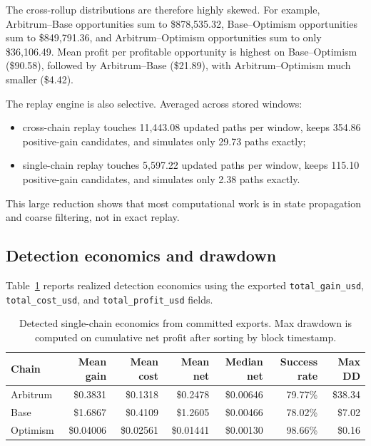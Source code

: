 \documentclass[11pt]{article}
\begin{document}
The cross-rollup distributions are therefore highly skewed. For example, Arbitrum--Base opportunities sum to \$878{,}535.32, Base--Optimism opportunities sum to \$849{,}791.36, and Arbitrum--Optimism opportunities sum to only \$36{,}106.49. Mean profit per profitable opportunity is highest on Base--Optimism (\$90.58), followed by Arbitrum--Base (\$21.89), with Arbitrum--Optimism much smaller (\$4.42).

The replay engine is also selective. Averaged across stored windows:
\begin{itemize}[leftmargin=1.5em]
    \item cross-chain replay touches 11{,}443.08 updated paths per window, keeps 354.86 positive-gain candidates, and simulates only 29.73 paths exactly;
    \item single-chain replay touches 5{,}597.22 updated paths per window, keeps 115.10 positive-gain candidates, and simulates only 2.38 paths exactly.
\end{itemize}

This large reduction shows that most computational work is in state propagation and coarse filtering, not in exact replay.

\subsection{Detection economics and drawdown}

Table~\ref{tab:detection_econ} reports realized detection economics using the exported \texttt{total\_gain\_usd}, \texttt{total\_cost\_usd}, and \texttt{total\_profit\_usd} fields.

\begin{table}[H]
\centering
\caption{Detected single-chain economics from committed exports. Max drawdown is computed on cumulative net profit after sorting by block timestamp.}
\label{tab:detection_econ}
\begin{tabular}{lrrrrrr}
\toprule
Chain & Mean gain & Mean cost & Mean net & Median net & Success rate & Max DD \\
\midrule
Arbitrum & \$0.3831 & \$0.1318 & \$0.2478 & \$0.00646 & 79.77\% & \$38.34 \\
Base & \$1.6867 & \$0.4109 & \$1.2605 & \$0.00466 & 78.02\% & \$7.02 \\
Optimism & \$0.04006 & \$0.02561 & \$0.01441 & \$0.00130 & 98.66\% & \$0.16 \\
\bottomrule
\end{tabular}
\end{table}
\end{document}
